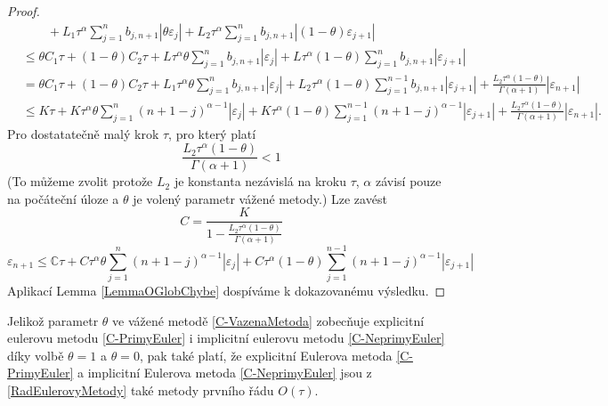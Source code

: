 \documentclass[a4paper,12pt,twoside]{article}
\theoremstyle{definition}
\theoremstyle{remark}
\numberwithin{equation}{section}
\numberwithin{table}{section}
\numberwithin{figure}{section}
\newcommand{\C}{\mathbb{C}}
\begin{document}
\begin{proof}
\begin{equation}
\begin{aligned}
			& \qquad + L_{1}\tau^{\alpha} \sum_{j = 1}^{n} 	b_{j,n+1}  | \theta \varepsilon_{j}| + L_{2}\tau^{\alpha} \sum_{j = 1}^{n} 	b_{j,n+1} |\left(1-\theta \right) \varepsilon_{j+1}| \\
			&\leq \theta C_{1} \tau + \left(1-\theta \right) C_{2} \tau + L \tau^{\alpha}\theta \sum_{j = 1}^{n} 	b_{j,n+1} | \varepsilon_{j}| + L \tau^{\alpha}\left(1-\theta \right) \sum_{j = 1}^{n} 	b_{j,n+1} | \varepsilon_{j+1}| \\
			& = \theta C_{1} \tau + \left(1-\theta \right) C_{2} \tau + L_{1} \tau^{\alpha}\theta \sum_{j = 1}^{n} 	b_{j,n+1} | \varepsilon_{j}| + L_{2} \tau^{\alpha}\left(1-\theta \right) \sum_{j = 1}^{n-1} 	b_{j,n+1} | \varepsilon_{j+1}| +  \frac{L_{2}\tau^{\alpha}\left(1-\theta\right)}{\Gamma\left(\alpha+1\right)} |\varepsilon_{n+1}|\\
			&\leq K \tau + K \tau^{\alpha}\theta \sum_{j = 1}^{n} 	\left(n+1-j\right)^{\alpha - 1} | \varepsilon_{j}| + K \tau^{\alpha}\left(1-\theta \right) \sum_{j = 1}^{n-1} 	\left(n+1-j\right)^{\alpha - 1} | \varepsilon_{j+1}| +\frac{L_{2}\tau^{\alpha}\left(1-\theta\right)}{\Gamma\left(\alpha+1\right)} |\varepsilon_{n+1}|.
		\end{aligned}	
	\end{equation}
	Pro dostatatečně malý krok $\tau$, pro který platí
	\begin{equation}
		\frac{L_{2}\tau^{\alpha}\left(1-\theta\right)}{\Gamma\left(\alpha+1\right)} < 1
	\end{equation}
	(To můžeme zvolit protože $L_{2}$ je konstanta nezávislá na kroku $\tau$, $\alpha$ závisí pouze na počáteční úloze a $\theta$  je volený parametr vážené metody.)
	Lze zavést
	$$C = \frac{K}{1 - \frac{L_{2}\tau^{\alpha}\left(1-\theta\right)}{ \Gamma\left(\alpha+1\right)}}$$
	\begin{equation}
		\varepsilon_{n+1} \leq \C \tau + C \tau^{\alpha}\theta \sum_{j = 1}^{n} 	\left(n+1-j\right)^{\alpha - 1} | \varepsilon_{j}| + C \tau^{\alpha}\left(1-\theta \right) \sum_{j = 1}^{n-1} 	\left(n+1-j\right)^{\alpha - 1} | \varepsilon_{j+1}|
	\end{equation}
	Aplikací Lemma \ref{LemmaOGlobChybe} dospíváme k dokazovanému výsledku. 
\end{proof}

Jelikož parametr $\theta$ ve vážené metodě \eqref{C-VazenaMetoda} zobecňuje explicitní eulerovu metodu \eqref{C-PrimyEuler} i implicitní eulerovu metodu \eqref{C-NeprimyEuler} díky volbě $\theta = 1$ a $\theta = 0$, pak také platí, že explicitní Eulerova metoda \eqref{C-PrimyEuler} a implicitní Eulerova metoda \eqref{C-NeprimyEuler} jsou z \ref{RadEulerovyMetody} také metody prvního řádu $O\left(\tau\right)$.
\end{document}
